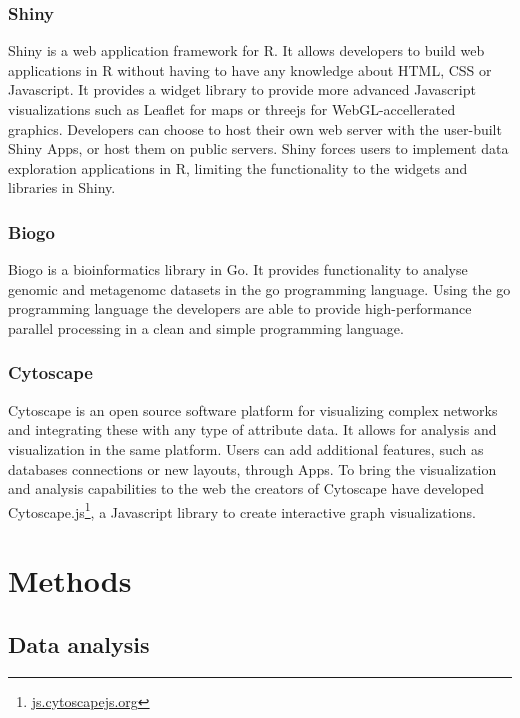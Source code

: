 \subsubsection*{Shiny} 
Shiny is a web application framework for R.\cite{shiny} It allows developers to
build web applications in R without having to have any knowledge about HTML, CSS
or Javascript. It provides a widget library to provide more advanced Javascript
visualizations such as Leaflet for maps or threejs for WebGL-accellerated
graphics. Developers can choose to host their own web server with the user-built
Shiny Apps, or host them on public servers. Shiny forces users to implement data
exploration applications in R, limiting the functionality to the 
widgets and libraries in Shiny. 


\subsubsection*{Biogo} 
Biogo is a bioinformatics library in Go. It provides functionality to analyse
genomic and metagenomc datasets in the go programming
language.\cite{Kortschak005033} Using the go programming language the developers
are able to provide high-performance parallel processing in a clean and simple
programming language. 

\subsubsection*{Cytoscape} 
Cytoscape is an open source software platform for visualizing complex
networks and integrating these with any type of attribute
data\cite{shannon2003cytoscape}. It allows for analysis and visualization in the
same platform. Users can add additional features, such as databases connections
or new layouts, through Apps. To bring the visualization and analysis
capabilities to the web the creators of Cytoscape have developed
Cytoscape.js\footnote{\url{js.cytoscapejs.org}}, a Javascript library to create
interactive graph visualizations. 


\section*{Methods} 
\subsection*{Data analysis} 

